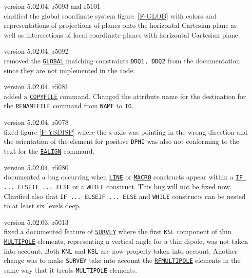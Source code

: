\begin{madlist}
  
   version 5.02.04, r5093 and r5101\\
  clarified the global coordinate system figure~\ref{F-GLOB} with colors and 
  representations of projections of planes onto the horizontal Cartesian 
  plane as well as intersections of local coordinate planes with horizontal 
  Cartesian plane. 
  
  
   version 5.02.04, r5092\\
  removed the \hyperref[sec:global]{\texttt{GLOBAL}} matching constraints
  \texttt{DDQ1, DDQ2} from the documentation since they are not
  implemented in the code.  
  
  
   version 5.02.04, r5081\\
  added a \hyperref[sec:copyfile]{\texttt{COPYFILE}} command. Changed the attribute 
  name for the destination for the \hyperref[sec:renamefile]{\texttt{RENAMEFILE}} 
  command from \texttt{NAME} to \texttt{TO}.
  
  
   version 5.02.04, r5078\\
  fixed figure \ref{F-YSDISP} where the \textit{x}-axis was pointing in
  the wrong direction and the orientation of the element for positive
  \texttt{DPHI} was also not conforming to the text for the
  \hyperref[sec:ealign]{\texttt{EALIGN}} command.
  
  
    version 5.02.04, r5080\\
  documented a bug occurring when \hyperref[sec:beamline]{\texttt{LINE}}
  or \hyperref[sec:macro]{\texttt{MACRO}} constructs appear within a
  \hyperref[sec:if]{\texttt{IF ... ELSEIF ... ELSE}} or a 
  \hyperref[sec:while]{\texttt{WHILE}} construct. This bug will not be
  fixed now. \\  
  Clarified also that \texttt{IF ... ELSEIF ... ELSE} and \texttt{WHILE}
  constructs can be nested to at least six levels deep.
  
  
   version 5.02.03, r5013\\
  fixed a documented feature of \hyperref[chap:survey]{\texttt{SURVEY}}
  where the first \texttt{KSL} component of thin
  \hyperref[sec:multipole]{\texttt{MULTIPOLE}} elements, representing a
  vertical angle for a thin dipole, was not taken into account. Both
  \texttt{KNL} and \texttt{KSL} are now properly taken into
  account. Another change was to make \texttt{SURVEY} take into account
  the \hyperref[sec:rfmultipole]{\texttt{RFMULTIPOLE}} elements in the
  same way that it treats \texttt{MULTIPOLE} elements.
  

\end{madlist}
